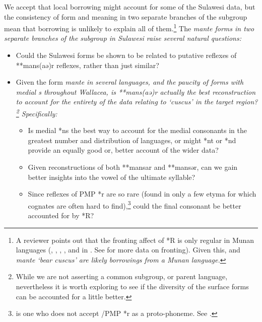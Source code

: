We accept that local borrowing might account for some of the
Sulawesi data, but the consistency of form
and meaning in two separate branches of the 
subgroup \citep{vandenBerg2003} mean that borrowing is unlikely
to explain all of them.\footnote{
		A reviewer points out that the
		fronting affect of *R is only regular in Munan languages (,
		, , , and  in .
		See  for more data on fronting).
		Given this,  and  \it{mante} ‘bear cuscus’ are
		likely borrowings from a Munan language.}
The \it{mante} forms
in two separate branches of the  subgroup in
Sulawesi raise several natural questions:

\begin{itemize}
	\item	Could the Sulawesi forms be shown to be related to putative
				reflexes of **mans(aə)r reflexes,
				rather than just similar?
	\item	Given the form \it{mante} in several languages,
				and the paucity of forms with medial \it{s} throughout
				Wallacea, is **mans(aə)r actually the best reconstruction to account for
				the entirety of the data relating to ‘cuscus’ in the target region?\footnote{
						While we are not asserting a common subgroup, or parent language,
						nevertheless it is worth exploring to see if the diversity of
						the surface forms can be accounted for a little better.}
				Specifically:
					\begin{itemize}
						\item	Is medial *ns the best way to account for the medial consonants
									in the greatest number
									and distribution of languages,
									or might *nt or *nd provide an equally good or,
									better account of the wider data?
						\item	Given reconstructions of both **mansar
									and **mansər, can we gain better insights into the vowel of the
									ultimate syllable? \item	Since reflexes of PMP *r are so rare (found in only a few
									etyma for which cognates are often hard to find),\footnote{
											\citet{Wolff2010}	is one who does not accept /PMP *r
											as a proto-phoneme. See .}
									could the final consonant be better accounted
									for by *R?
					\end{itemize}
\end{itemize}